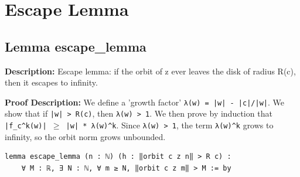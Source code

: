\section{Escape Lemma}

\subsection*{Lemma escape\_lemma}
\textbf{Description:} Escape lemma: if the orbit of z ever leaves the disk of radius R(c), then it
escapes to infinity.

\textbf{Proof Description:} We define a 'growth factor' \texttt{λ(w) = |w| - |c|/|w|}.
We show that if \texttt{|w| > R(c)}, then \texttt{λ(w) > 1}.
We then prove by induction that \texttt{|f\_c\^{}k(w)| $\ge$ |w| * λ(w)\^{}k}.
Since \texttt{λ(w) > 1}, the term \texttt{λ(w)\^{}k} grows to infinity, so the orbit norm grows unbounded.

\begin{lstlisting}[language=Lean]
lemma escape_lemma (n : ℕ) (h : ‖orbit c z n‖ > R c) :
    ∀ M : ℝ, ∃ N : ℕ, ∀ m ≥ N, ‖orbit c z m‖ > M := by
\end{lstlisting}

